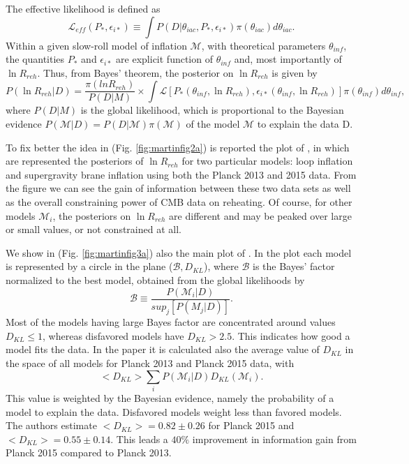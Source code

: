 \documentclass[11pt,a4paper,twoside]{book}
\begin{document}
The effective likelihood is defined as 
\begin{equation}
\label{Chap3:effectiveLikelihood}
\mathcal{L}_{eff}(P_{*},\epsilon_{i*}) \equiv \int P(D|\theta_{iac}, P_{*}, \epsilon_{i*})\pi(\theta_{iac})d\theta_{iac}.
\end{equation} 
Within a given slow-roll model of inflation $\mathcal{M}$, with theoretical parameters $\theta_{inf}$, the quantities $ P_{*} $ and $ \epsilon_{i*} $ are explicit function of $\theta_{inf}$ and, most importantly of $ \ln R_{reh} $. Thus, from Bayes' theorem, the posterior on $ \ln R_{reh} $ is given by
\begin{equation}
	P(\ln R_{reh}|D)= \frac{\pi(ln R_{reh})}{P(D|M)}
	\times \int \mathcal{L}[P_{*}(\theta_{inf},\ln R_{reh}), \epsilon_{i*}(\theta_{inf},\ln R_{reh})]\pi(\theta_{inf})d\theta_{inf},
\end{equation}
where $ P(D|M) $ is the global likelihood, which is proportional  to the Bayesian evidence $ P(\mathcal{M}|D)=P(D|\mathcal{M})\pi(\mathcal{M}) $ of the model $\mathcal{M}$ to explain the data D.

To fix better the idea in (Fig. \ref{fig:martinfig2a}) is reported the plot of \cite{Chap3:Martin_Milestone}, in which are represented the posteriors of $ \ln R_{reh} $ for two particular models: loop inflation and supergravity brane inflation using both the Planck 2013 and 2015 data. From the figure we can see the gain of information between these two data sets as well as the overall constraining power of CMB data on reheating. Of course, for other models $ \mathcal{M}_{i} $, the posteriors on $ \ln R_{reh} $ are different and may be peaked over large or small values, or not constrained at all.

We show in (Fig. \ref{fig:martinfig3a}) also the main plot of \cite{Chap3:Martin_Milestone}. In the plot each model is represented by a circle in the plane ($ \mathcal{B},D_{KL} $), where $\mathcal{B}$ is the Bayes' factor normalized to the best model, obtained from the global likelihoods by 
\begin{equation}
	\label{Chap3:BayesFactor}
	\mathcal{B} \equiv \frac{P(\mathcal{M}_{i}|D)}{sup_{j}[P(M_{j}|D)]}.
\end{equation}
Most of the models having large Bayes factor are concentrated around values $ D_{KL} \le 1 $, whereas disfavored models have $ D_{KL} > 2.5 $. This indicates how good a model fits the data. In the paper it is calculated also the average value of $ D_{KL} $ in the space of all models for Planck 2013 and Planck 2015 data, with 
\begin{equation}
<D_{KL}>\sum_{i} P(\mathcal{M}_{i}|D)D_{KL}(\mathcal{M}_{i}).
\end{equation}
This value is weighted by the Bayesian evidence, namely the probability of a model to explain the data. Disfavored models weight less than favored models. The authors estimate $ <D_{KL}> = 0.82 \pm 0.26 $ for Planck 2015 and  $ <D_{KL}> = 0.55 \pm 0.14 $. This leads a $ 40\% $ improvement in information gain from Planck 2015 compared to Planck 2013.
\end{document}
